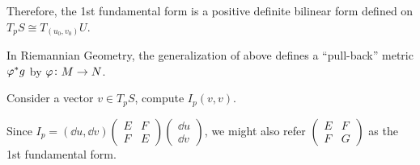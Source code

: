 Therefore, the 1st fundamental form is a positive definite bilinear form
defined on \(T_p S\cong T_{(u_0,v_0)}U\).

\begin{remark}
    In Riemannian Geometry, the generalization of above defines a ``pull-back''
    metric \(\varphi^*g\) by \(\varphi\colon M\to N\).
\end{remark}

\begin{exercise}
    Consider a vector \(v\in T_p S\), compute \(I_p(v,v)\).
\end{exercise}

\begin{remark}
    Since \(I_p=(\dd{u},\dd{v})\begin{pmatrix}
        E & F \\
        F & E
    \end{pmatrix}\begin{pmatrix}
        \dd{u} \\ \dd{v}
    \end{pmatrix}\), we might also refer \(\begin{pmatrix}
        E & F \\
        F & G
    \end{pmatrix}\) as the 1st fundamental form.
\end{remark}


